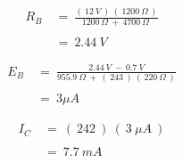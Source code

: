 {\bfseries\itshape{}} 

\begin{flushright}
{\bfseries\itshape{}} \hfill \break
\end{flushright}

\begin{ceqn}
\begin{align}
R_{B}\ &=\ \frac{(\ 12\ V\ )\ (\ 1200\ \Omega\ )}{1200\ \Omega\ +\ 4700\ \Omega\ } \\ \\
&=\ 2.44\ V
\end{align}
\end{ceqn} \hfill \break

{\bfseries\itshape{}} 

\begin{flushright}
{\bfseries\itshape{}} \hfill \break
\end{flushright} 

\begin{ceqn}
\begin{align}
E_{B}\ &=\ \frac{2.44\ V\ -\ 0.7\ V}{955.9\ \Omega\ +\ (\ 243\ )\ (\ 220\ \Omega\ )} \\ \\
&=\ 3 \mu A
\end{align}
\end{ceqn} 

{\bfseries\itshape{}} 

\begin{flushright}
{\bfseries\itshape{}} \hfill \break
\end{flushright}

\begin{ceqn}
\begin{align}
I_{C}\ &=\ (\ 242\ )\ (\ 3\ \mu A\ ) \\ \\
&=\ 7.7\ mA
\end{align}
\end{ceqn} \hfill \break

